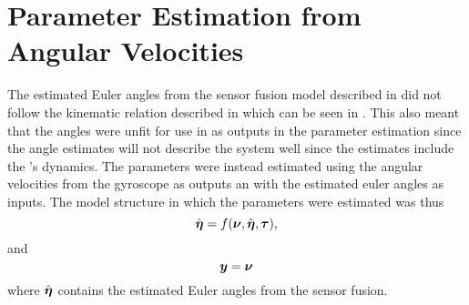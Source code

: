 %
%
%


\section{Parameter Estimation from Angular Velocities} \label{sec:estimation_angular}
The estimated Euler angles from the sensor fusion model described in  did not follow the kinematic relation described in  which can be seen in . This also meant that the angles were unfit for use in as outputs in the parameter estimation since the angle estimates will not describe the system well since the estimates include the \abbrEKF's dynamics. The parameters were instead estimated using the angular velocities from the gyroscope as outputs an with the estimated euler angles as inputs. The model structure in which the parameters were estimated was thus 
\begin{equation}
\dot{\boldsymbol{\eta}} = f(\boldsymbol{\nu}, \hat{\boldsymbol{\eta}}, \boldsymbol{\tau}),
\end{equation}
and
\begin{equation}
\boldsymbol{y} = \boldsymbol{\nu}
\end{equation}
where $\hat{\boldsymbol{\eta}}$ contains the estimated Euler angles from the sensor fusion.

